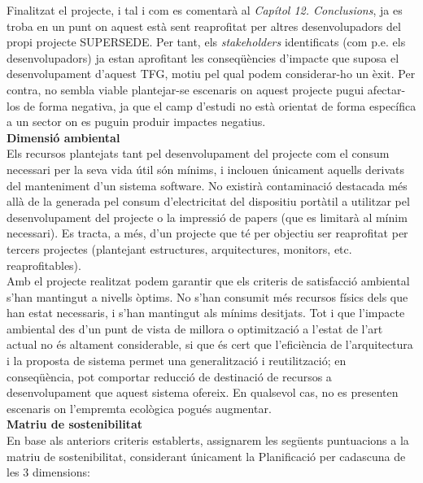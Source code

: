 Finalitzat el projecte, i tal i com es comentarà al \textit{Capítol 12. Conclusions}, ja es troba en un punt on aquest està sent reaprofitat per altres desenvolupadors del propi projecte SUPERSEDE. Per tant, els \textit{stakeholders} identificats (com p.e. els desenvolupadors) ja estan aprofitant les conseqüències d'impacte que suposa el desenvolupament d'aquest TFG, motiu pel qual podem considerar-ho un èxit. Per contra, no sembla viable plantejar-se escenaris on aquest projecte pugui afectar-los de forma negativa, ja que el camp d'estudi no està orientat de forma específica a un sector on es puguin produir impactes negatius.\\

\noindent \textbf{\large Dimensió ambiental}\\

\noindent Els recursos plantejats tant pel desenvolupament del projecte com el consum necessari per la seva vida útil són mínims, i inclouen únicament aquells derivats del manteniment d’un sistema software. No existirà contaminació destacada més allà de la generada pel consum d’electricitat del dispositiu portàtil a utilitzar pel desenvolupament del projecte o la impressió de papers (que es limitarà al mínim necessari). Es tracta, a més, d’un projecte que té per objectiu ser reaprofitat per tercers projectes (plantejant estructures, arquitectures, monitors, etc. reaprofitables).\\

Amb el projecte realitzat podem garantir que els criteris de satisfacció ambiental s'han mantingut a nivells òptims. No s'han consumit més recursos físics dels que han estat necessaris, i s'han mantingut als mínims desitjats. Tot i que l'impacte ambiental des d'un punt de vista de millora o optimització a l'estat de l'art actual no és altament considerable, si que és cert que l'eficiència de l'arquitectura i la proposta de sistema permet una generalització i reutilització; en conseqüència, pot comportar reducció de destinació de recursos a desenvolupament que aquest sistema ofereix. En qualsevol cas, no es presenten escenaris on l'empremta ecològica pogués augmentar.\\

\noindent \textbf{\large Matriu de sostenibilitat}\\

\noindent En base als anteriors criteris establerts, assignarem les següents puntuacions a la matriu de sostenibilitat, considerant únicament la Planificació per cadascuna de les 3 dimensions:

